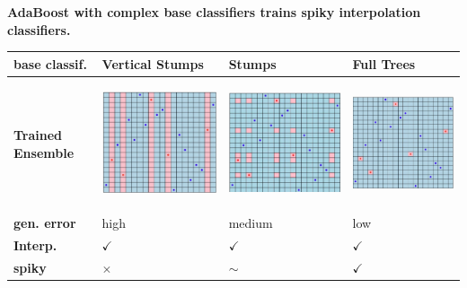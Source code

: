 \begin{minipage}{\columnwidth}
	\textbf{AdaBoost with complex base classifiers trains spiky interpolation classifiers.}



\begin{tabular}{p{} | p{} | p{} | p{}}
		\textbf{base classif.} & \textbf{Vertical Stumps} & \textbf{Stumps} & \textbf{Full Trees}\\\hline
		\textbf{Trained Ensemble}
		&
  		\begin{center}
  		\vspace{-1em}
			\includegraphics[width=0.2\columnwidth]{images/9-adaboost-baseclassif-1}
		\end{center} &  
		\begin{center}
  		\vspace{-1em}
			\includegraphics[width=0.2\columnwidth]{images/9-adaboost-baseclassif-2}
		\end{center}
  		& 
  		\begin{center}
  		\vspace{-1em}
			\includegraphics[width=0.2\columnwidth]{images/9-adaboost-baseclassif-3}
		\end{center} \\\hline
		\textbf{gen. error} & high & medium & low \\\hline
		\textbf{Interp.} & $\checkmark$ & $\checkmark$ & $\checkmark$ \\\hline
		\textbf{spiky} & $\times$ & $\sim$ & $\checkmark$ \\\hline
\end{tabular}
\end{minipage}

